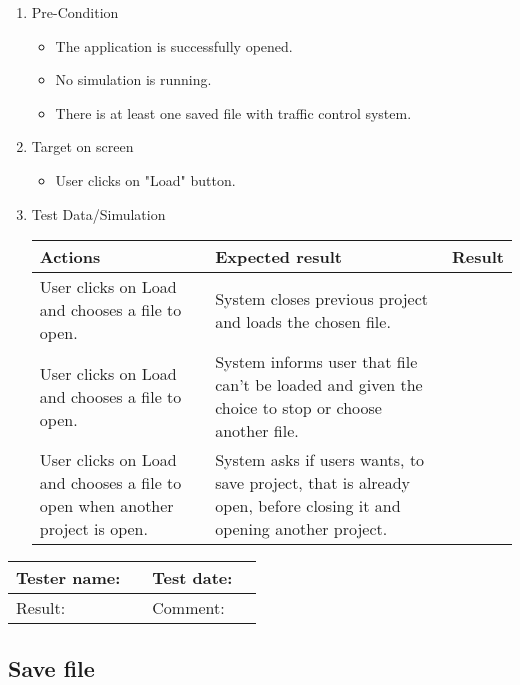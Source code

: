 \begin{enumerate}
	\item Pre-Condition
	\begin{itemize}
		\item The application is successfully opened.
		\item No simulation is running.
		\item There is at least one saved file with traffic control
		system.
	\end{itemize}
	\item Target on screen
	\begin{itemize}
		\item User clicks on "Load" button.
	\end{itemize}
	\item Test Data/Simulation
	\begin{tabularx}{\textwidth}{|X|X|p{2.5cm}|}\hline
		Actions & Expected result & Result \\\hline
		User clicks on Load and chooses a file to open. & System closes previous project and loads the chosen file.  & \pass \\\hline 
		User clicks on Load and chooses a file to open. & System informs user that file can’t be loaded and given the choice
		to stop or choose another file. & \pass \\\hline 
		User clicks on Load and chooses a file to open when another project is open. & System asks if users wants, to save project, that is already open, before closing it and opening another project. & \pass \\\hline 
	\end{tabularx}
\end{enumerate}

\begin{tabularx}{\textwidth}{|p{3cm}X|p{3cm}X|}\hline
	Tester name: &  & Test date: & \\\hline
	Result: &  \pass & Comment: & \\\hline
\end{tabularx}

\subsection{Save file}

